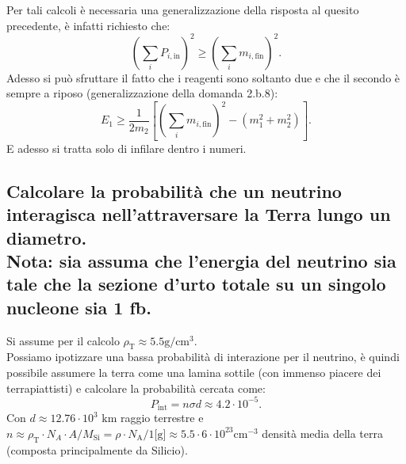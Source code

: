 Per tali calcoli è necessaria una generalizzazione della risposta al quesito precedente, è infatti richiesto che:
\[
	\left( \sum_i P_{i,\text{in}} \right)^2 \ge \left(\sum_{i} m_{i, \text{fin}} \right)^2  
.\] 
Adesso si può sfruttare il fatto che i reagenti sono soltanto due e che il secondo è sempre a riposo (generalizzazione della domanda 2.b.8):
\[
	E_1 \ge \frac{1}{2m_2}\left[ \left( \sum_{i} m_{i, \text{fin}} \right)^2 - \left( m_1^2 + m_2^2 \right)  \right] 
.\]
E adesso si tratta solo di infilare dentro i numeri.

\subsection[]{ Calcolare la probabilità che un neutrino interagisca nell’attraversare la Terra lungo un diametro.\\
Nota: sia assuma che l’energia del neutrino sia tale che la sezione d’urto totale su un singolo nucleone sia 1 fb. } 
Si assume per il calcolo $\rho_{\text{T}} \approx 5.5 \text{g}/\text{cm}^3$.\\
Possiamo ipotizzare una bassa probabilità di interazione per il neutrino, è quindi possibile assumere la terra come una lamina sottile (con immenso piacere dei terrapiattisti) e calcolare la probabilità cercata come:
\[
P_{\text{int}} = n \sigma d \approx 4.2 \cdot 10^{-5} 
.\] 
Con $d \approx 12.76 \cdot 10^{3} \text{ km}$ raggio terrestre e $n \approx \rho_{\text{T}}\cdot N_A\cdot A / M_{\text{Si}} = \rho\cdot N_{\text{A}} / 1 \text{[g]} \approx 5.5\cdot 6 \cdot 10^{23} \text{cm}^{-3}$ densità media della terra (composta principalmente da Silicio).

